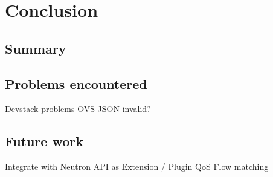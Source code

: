  \cleardoublepage
\chapter{Conclusion}

\section{Summary}

\section{Problems encountered}

Devstack problems
OVS JSON invalid?

\section{Future work}

Integrate with Neutron API as Extension / Plugin
QoS Flow matching
